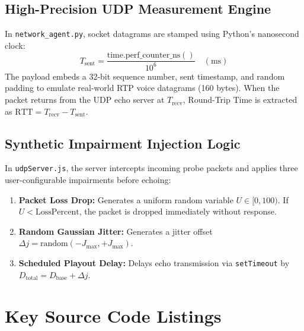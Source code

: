 \documentclass[12pt, a4paper]{report}
\begin{document}
\section{High-Precision UDP Measurement Engine}
In \texttt{network\_agent.py}, socket datagrams are stamped using Python's nanosecond clock:
\begin{equation}
T_{\text{sent}} = \frac{\text{time.perf\_counter\_ns}()}{10^6} \quad (\text{ms})
\end{equation}
The payload embeds a 32-bit sequence number, sent timestamp, and random padding to emulate real-world RTP voice datagrams (160 bytes). When the packet returns from the UDP echo server at $T_{\text{recv}}$, Round-Trip Time is extracted as $\text{RTT} = T_{\text{recv}} - T_{\text{sent}}$.

\section{Synthetic Impairment Injection Logic}
In \texttt{udpServer.js}, the server intercepts incoming probe packets and applies three user-configurable impairments before echoing:
\begin{enumerate}
    \item \textbf{Packet Loss Drop:} Generates a uniform random variable $U \in [0, 100)$. If $U < \text{LossPercent}$, the packet is dropped immediately without response.
    \item \textbf{Random Gaussian Jitter:} Generates a jitter offset $\Delta j = \text{random}(-J_{\text{max}}, +J_{\text{max}})$.
    \item \textbf{Scheduled Playout Delay:} Delays echo transmission via \texttt{setTimeout} by $D_{\text{total}} = D_{\text{base}} + \Delta j$.
\end{enumerate}

\newpage
\chapter{Key Source Code Listings}
\end{document}
